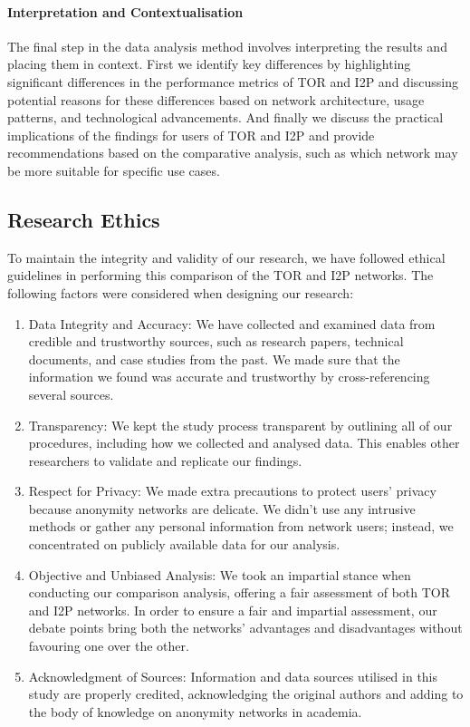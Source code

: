 \documentclass[12pt,conference]{IEEEtran}
\begin{document}
\paragraph{Interpretation and Contextualisation}
The final step in the data analysis method involves interpreting the results and placing them in context. First we identify key differences by highlighting significant differences in the performance metrics of TOR and I2P and discussing potential reasons for these differences based on network architecture, usage patterns, and technological advancements. And finally we discuss the practical implications of the findings for users of TOR and I2P and provide recommendations based on the comparative analysis, such as which network may be more suitable for specific use cases.

\subsection{Research Ethics}
To maintain the integrity and validity of our research, we have followed ethical guidelines in performing this comparison of the TOR and I2P networks. The following factors were considered when designing our research: 
\begin{enumerate}
	\item Data Integrity and Accuracy: We have collected and examined data from credible and trustworthy sources, such as research papers, technical documents, and case studies from the past. We made sure that the information we found was accurate and trustworthy by cross-referencing several sources.
	\item Transparency: We kept the study process transparent by outlining all of our procedures, including how we collected and analysed data. This enables other researchers to validate and replicate our findings.
	\item Respect for Privacy: We made extra precautions to protect users' privacy because anonymity networks are delicate. We didn't use any intrusive methods or gather any personal information from network users; instead, we concentrated on publicly available data for our analysis.
	\item Objective and Unbiased Analysis: We took an impartial stance when conducting our comparison analysis, offering a fair assessment of both TOR and I2P networks. In order to ensure a fair and impartial assessment, our debate points bring both the networks' advantages and disadvantages without favouring one over the other.
	\item Acknowledgment of Sources:  Information and data sources utilised in this study are properly credited, acknowledging the original authors and adding to the body of knowledge on anonymity networks in academia.
\end{enumerate}
\end{document}

